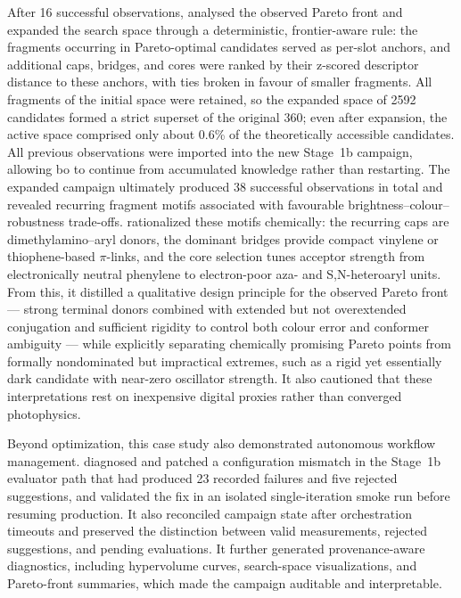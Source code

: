 After 16 successful observations, \optima{} analysed the observed Pareto front and expanded the search space through a deterministic, frontier-aware rule: the fragments occurring in Pareto-optimal candidates served as per-slot anchors, and additional caps, bridges, and cores were ranked by their z-scored descriptor distance to these anchors, with ties broken in favour of smaller fragments.
All fragments of the initial space were retained, so the expanded space of 2592 candidates formed a strict superset of the original 360; even after expansion, the active space comprised only about 0.6\% of the theoretically accessible candidates.
All previous observations were imported into the new Stage~1b campaign, allowing \ac{bo} to continue from accumulated knowledge rather than restarting.
The expanded campaign ultimately produced 38 successful observations in total and revealed recurring fragment motifs associated with favourable brightness--colour--robustness trade-offs.
\optima{} rationalized these motifs chemically: the recurring caps are dimethylamino--aryl donors, the dominant bridges provide compact vinylene or thiophene-based $\pi$-links, and the core selection tunes acceptor strength from electronically neutral phenylene to electron-poor aza- and S,N-heteroaryl units.
From this, it distilled a qualitative design principle for the observed Pareto front --- strong terminal donors combined with extended but not overextended conjugation and sufficient rigidity to control both colour error and conformer ambiguity --- while explicitly separating chemically promising Pareto points from formally nondominated but impractical extremes, such as a rigid yet essentially dark candidate with near-zero oscillator strength.
It also cautioned that these interpretations rest on inexpensive digital proxies rather than converged photophysics.

Beyond optimization, this case study also demonstrated autonomous workflow management.
\optima{} diagnosed and patched a configuration mismatch in the Stage~1b evaluator path that had produced 23 recorded failures and five rejected suggestions, and validated the fix in an isolated single-iteration smoke run before resuming production.
It also reconciled campaign state after orchestration timeouts and preserved the distinction between valid measurements, rejected suggestions, and pending evaluations.
It further generated provenance-aware diagnostics, including hypervolume curves, search-space visualizations, and Pareto-front summaries, which made the campaign auditable and interpretable.

